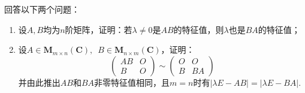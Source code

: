 \begin{example}{}{}
    回答以下两个问题：
    \begin{enumerate}
        \item \label{item:18:特征值相同:1}
              设$A,B$均为$n$阶矩阵，证明：若$\lambda\neq 0$是$AB$的特征值，则$\lambda$也是$BA$的特征值；

        \item \label{item:18:特征值相同:2}
              设$A\in \mathbf{M}_{m\times n}(\mathbf{C}),\enspace B\in \mathbf{M}_{n\times m}(\mathbf{C})$，证明：
              \[ \begin{pmatrix}
                      AB & O \\ B & O
                  \end{pmatrix}\sim\begin{pmatrix}
                      O & O \\ B & BA
                  \end{pmatrix} \]
              并由此推出$AB$和$BA$非零特征值相同，且$m=n$时有$|\lambda E-AB|=|\lambda E-BA|$.
    \end{enumerate}
\end{example}

